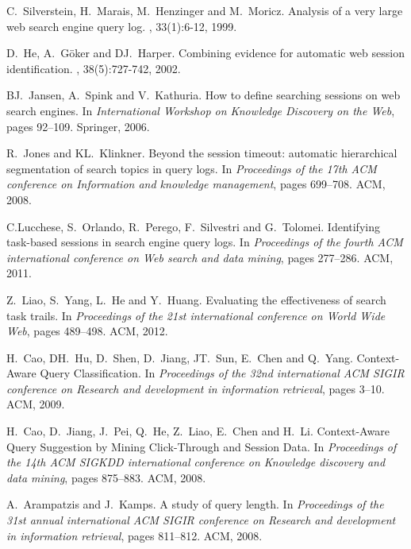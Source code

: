 \documentclass[sigconf,anonymous]{acmart}
\theoremstyle{definition}
\begin{document}
\begin{thebibliography}{10}
C.~Silverstein, H.~Marais, M.~Henzinger and M.~Moricz.
\newblock Analysis of a very large web search engine query log. 
, 33(1):6-12, 1999.

D.~He, A.~G{\"o}ker and DJ.~Harper.
\newblock Combining evidence for automatic web session identification. 
, 38(5):727-742, 2002.

BJ.~Jansen, A.~Spink and V.~Kathuria.
\newblock How to define searching sessions on web search engines. 
\newblock In {\em International Workshop on Knowledge Discovery on the Web}, pages 92--109. Springer, 2006.

R.~Jones and KL.~Klinkner.
\newblock Beyond the session timeout: automatic hierarchical segmentation of search topics in query logs. 
\newblock In {\em Proceedings of the 17th ACM conference on Information and knowledge management}, pages 699--708. ACM, 2008.

C.Lucchese, S.~Orlando, R.~Perego, F.~Silvestri and G.~Tolomei.
\newblock Identifying task-based sessions in search engine query logs. 
\newblock In {\em Proceedings of the fourth ACM international conference on Web search and data mining}, pages 277--286. ACM, 2011.

Z.~Liao, S.~Yang, L.~He and Y.~Huang.
\newblock Evaluating the effectiveness of search task trails.
\newblock In {\em Proceedings of the 21st international conference on World Wide Web}, pages 489--498. ACM, 2012.

H.~Cao, DH.~Hu, D.~Shen, D.~Jiang, JT.~Sun, E.~Chen and Q.~Yang.
\newblock Context-Aware Query Classification.
\newblock In {\em Proceedings of the 32nd international ACM SIGIR conference on Research and development in information retrieval}, pages 3--10. ACM, 2009.

H.~Cao, D.~Jiang, J.~Pei, Q.~He, Z.~Liao, E.~Chen and H.~Li.
\newblock Context-Aware Query Suggestion by Mining Click-Through and Session Data.
\newblock In {\em Proceedings of the 14th ACM SIGKDD international conference on Knowledge discovery and data mining}, pages 875--883. ACM, 2008.

A.~Arampatzis and J.~Kamps.
\newblock A study of query length.
\newblock In {\em Proceedings of the 31st annual international ACM SIGIR conference on Research and development in information retrieval}, pages 811--812. ACM, 2008.


\end{thebibliography}
\end{document}
